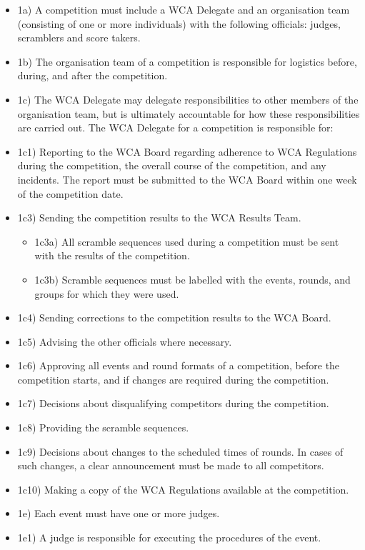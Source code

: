 \begin{itemize}
\item
  1a) A competition must include a WCA Delegate and an organisation team
  (consisting of one or more individuals) with the following officials:
  judges, scramblers and score takers.
\item
  1b) The organisation team of a competition is responsible for
  logistics before, during, and after the competition.
\item
  1c) The WCA Delegate may delegate responsibilities to other members of
  the organisation team, but is ultimately accountable for how these
  responsibilities are carried out. The WCA Delegate for a competition
  is responsible for:
\item
  1c1) Reporting to the WCA Board regarding adherence to WCA Regulations
  during the competition, the overall course of the competition, and any
  incidents. The report must be submitted to the WCA Board within one
  week of the competition date.
\item
  1c3) Sending the competition results to the WCA Results Team.

  \begin{itemize}
  \item
    1c3a) All scramble sequences used during a competition must be sent
    with the results of the competition.
  \item
    1c3b) Scramble sequences must be labelled with the events, rounds,
    and groups for which they were used.
  \end{itemize}
\item
  1c4) Sending corrections to the competition results to the WCA Board.
\item
  1c5) Advising the other officials where necessary.
\item
  1c6) Approving all events and round formats of a competition, before
  the competition starts, and if changes are required during the
  competition.
\item
  1c7) Decisions about disqualifying competitors during the competition.
\item
  1c8) Providing the scramble sequences.
\item
  1c9) Decisions about changes to the scheduled times of rounds. In
  cases of such changes, a clear announcement must be made to all
  competitors.
\item
  1c10) Making a copy of the WCA Regulations available at the
  competition.
\item
  1e) Each event must have one or more judges.
\item
  1e1) A judge is responsible for executing the procedures of the event.


\end{itemize}

